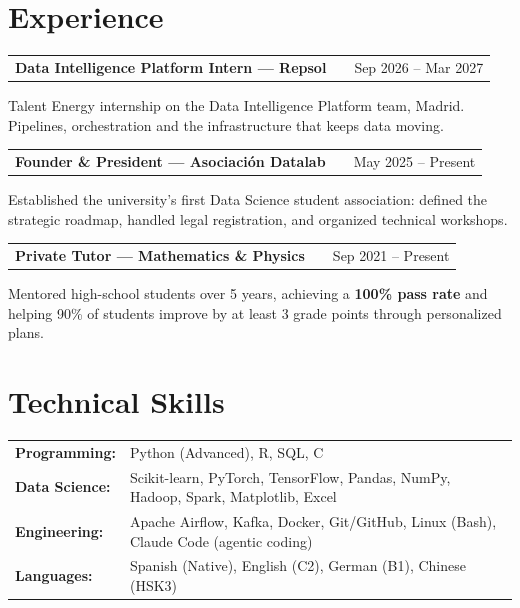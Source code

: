 \documentclass[a4paper,10pt]{article}
\makeatletter
\newenvironment{jobshort}[2]
    {
    \begin{tabularx}{\linewidth}{@{}l X r@{}}
    \textbf{#1} & \hfill & \small #2 \\[3pt]
    \end{tabularx}
    }
    {}
\makeatother
\begin{document}
\section{Experience}

\begin{jobshort}{Data Intelligence Platform Intern --- Repsol}{Sep 2026 -- Mar 2027}
\small Talent Energy internship on the Data Intelligence Platform team, Madrid. Pipelines, orchestration and the infrastructure that keeps data moving.
\end{jobshort}

\vspace{6pt}
\begin{jobshort}{Founder \& President --- Asociación Datalab}{May 2025 -- Present}
\small Established the university's first Data Science student association: defined the strategic roadmap, handled legal registration, and organized technical workshops.
\end{jobshort}

\vspace{6pt}
\begin{jobshort}{Private Tutor --- Mathematics \& Physics}{Sep 2021 -- Present}
\small Mentored high-school students over 5 years, achieving a \textbf{100\% pass rate} and helping 90\% of students improve by at least 3 grade points through personalized plans.
\end{jobshort}

\section{Technical Skills}
\begin{tabularx}{\linewidth}{@{}l X@{}}
\textbf{Programming:}  & Python (Advanced), R, SQL, C \\
\textbf{Data Science:} & Scikit-learn, PyTorch, TensorFlow, Pandas, NumPy, Hadoop, Spark, Matplotlib, Excel \\
\textbf{Engineering:}  & Apache Airflow, Kafka, Docker, Git/GitHub, Linux (Bash), Claude Code (agentic coding) \\
\textbf{Languages:}    & Spanish (Native), English (C2), German (B1), Chinese (HSK3) \\
\end{tabularx}
\end{document}
